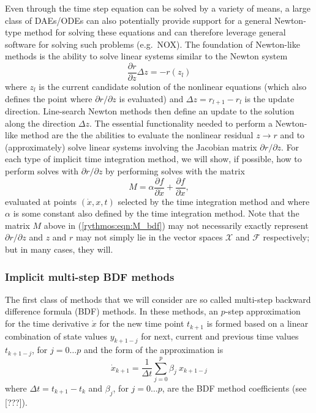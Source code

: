 \documentclass[pdf,ps2pdf,11pt]{SANDreport}
\begin{document}
Even through the time step equation can be solved by a variety of means, a
large class of DAEs/ODEs can also potentially provide support for a general
Newton-type method for solving these equations and can therefore leverage
general software for solving such problems (e.g.\ NOX).  The foundation of
Newton-like methods is the ability to solve linear systems similar to the
Newton system
%
\begin{equation}
\frac{\partial r}{\partial z} \Delta z = - r(z_l)
\end{equation}
%
where $z_l$ is the current candidate solution of the nonlinear equations
(which also defines the point where $\partial r / {}\partial z$ is evaluated)
and $\Delta z = r_{l+1} - r_l$ is the update direction.  Line-search Newton
methods then define an update to the solution along the direction $\Delta z$.
The essential functionality needed to perform a Newton-like method are the the
abilities to evaluate the nonlinear residual $z {}\rightarrow r$ and to
(approximately) solve linear systems involving the Jacobian matrix ${}\partial
r / {}\partial z$.  For each type of implicit time integration method, we will
show, if possible, how to perform solves with ${}\partial r / {}\partial z$ by
performing solves with the matrix
%
\begin{equation}
M = \alpha \frac{\partial f}{\partial \dot{x}} + \frac{\partial f}{\partial x},
\label{rythmos:eqn:M}
\end{equation}
%
evaluated at points $(\dot{x},x,t)$ selected by the time integration method
and where $\alpha$ is some constant also defined by the time integration
method.  Note that the matrix $M$ above in (\ref{rythmos:eqn:M_bdf}) may not
necessarily exactly represent ${}\partial r / {}\partial z$ and $z$ and $r$
may not simply lie in the vector spaces $\mathcal{X}$ and $\mathcal{F}$
respectively; but in many cases, they will.

\subsubsection{Implicit multi-step BDF methods}

The first class of methods that we will consider are so called multi-step
backward difference formula (BDF) methods.  In these methods, an $p$-step
approximation for the time derivative $\dot{x}$ for the new time point
$t_{k+1}$ is formed based on a linear combination of state values $y_{k+1-j}$
for next, current and previous time values $t_{k+1-j}$, for $j = 0 {}\ldots p$
and the form of the approximation is
%
\begin{equation}
\dot{x}_{k+1} = \frac{1}{\Delta t} \sum_{j=0}^{p} \beta_j \: x_{k+1-j}
\label{rythmos:eqn:bdf_x_dot}
\end{equation}
%
where $\Delta t = t_{k+1} - t_k$ and $\beta_j$, for $j=0 {}\ldots p$, are the
BDF method coefficients (see [???]).
\end{document}
